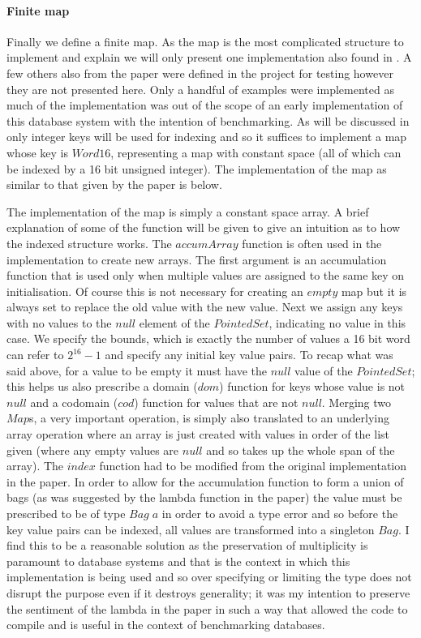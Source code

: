 \paragraph{Finite map} Finally we define a finite map. As the map is the most
complicated structure to implement and explain we will only present one
implementation also found in \relalg{}. A few others also from the paper were
defined in the project for testing however they are not presented here. Only a
handful of examples were implemented as much of the implementation was out of
the scope of an early implementation of this database system with the intention
of benchmarking. As will be discussed in  only
integer keys will be used for indexing and so it suffices to implement a map
whose key is $Word16$, representing a map with constant space (all of which can
be indexed by a 16 bit unsigned integer). The implementation of the map as
similar to that given by the paper is below.



\noindent
The implementation of the map is simply a constant space array. A brief
explanation of some of the function will be given to give an intuition as to how
the indexed structure works. The $accumArray$ function is often used in the
implementation to create new arrays. The first argument is an accumulation
function that is used only when multiple values are assigned to the same key on
initialisation. Of course this is not necessary for creating an $empty$ map but
it is always set to replace the old value with the new value. Next we assign any
keys with no values to the $null$ element of the $PointedSet$, indicating no
value in this case. We specify the bounds, which is exactly the number of values
a 16 bit word can refer to $2^16 - 1$ and specify any initial key value pairs.
To recap what was said above, for a value to be empty it must have the $null$
value of the $PointedSet$; this helps us also prescribe a domain ($dom$)
function for keys whose value is not $null$ and a codomain ($cod$) function for
values that are not $null$. Merging two $Map$s, a very important operation,
is simply also translated to an underlying array operation where an array is
just created with values in order of the list given (where any empty values are
$null$ and so takes up the whole span of the array). The $index$ function had to
be modified from the original implementation in the paper. In order to allow for
the accumulation function to form a union of bags (as was suggested by the
lambda function in the paper) the value must be prescribed to be of type
$Bag\;a$ in order to avoid a type error and so before the key value pairs can be indexed, all values are
transformed into a singleton $Bag$. I find this to be a reasonable solution as the
preservation of multiplicity is paramount to database systems and that is the
context in which this implementation is being used and so over specifying or
limiting the type does not disrupt the purpose even if it destroys generality; it
was my intention to preserve the sentiment of the lambda in the paper in such a
way that allowed the code to compile and is useful in the context of
benchmarking databases.
